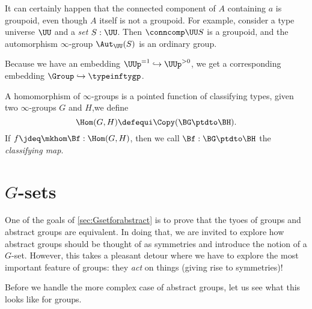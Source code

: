 \begin{remark}\label{rem:autinfgp}
  It can certainly happen that the connected component of $A$ containing $a$
  is groupoid, even though $A$ itself is not a groupoid.
  For example, consider a type universe $\UU$ and a \emph{set} $S:\UU$.
  Then $\conncomp\UU S$ is a groupoid, and the automorphism $\infty$-group
  $\Aut_\UU(S)$ is an ordinary group.

  Because we have an embedding $\UUp^{=1} \hookrightarrow \UUp^{>0}$,
  we get a corresponding embedding $\Group \hookrightarrow \typeinftygp$.
\end{remark}

\begin{definition}
  A homomorphism of $\infty$-groups is a pointed function of classifying types, \ie
  given two $\infty$-groups $G$ and $H$,we define
  \[
    \Hom(G,H)\defequi\Copy(\BG\ptdto\BH).
  \]
  If $f \jdeq \mkhom\Bf: \Hom(G,H)$, then we call
  $\Bf : \BG\ptdto\BH$ the \emph{classifying map}.
\end{definition}

\section{$G$-sets}
\label{sec:gsets}

One of the goals of \cref{sec:Gsetforabstract} is to prove that the tyoes of groups and abstract groups are equivalent.
In doing that, we are invited to explore how abstract groups should be thought of as symmetries and introduce the notion of a $G$-set.
However, this takes a pleasant detour where we have to explore the most important feature of groups: they \emph{act} on things (giving rise to symmetries)!

Before we handle the more complex case of abstract groups,
let us see what this looks like for groups.

